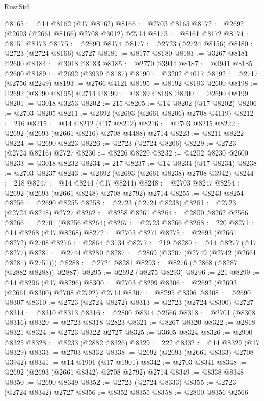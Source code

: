 \begin{lexlean}{RustStd}
\begin{coremodule}
@8165 := @14 @8162 (@17 @8162)
@8166 := @2703 @8165
@8172 := @2692 (@2693 (@2661 @8166) @2708 @3012) @2714
@8173 := @8161 @8172
@8174 := @8151 @8173
@8175 := @2690 @8174
@8177 := @2723 (@2724 @8156)
@8180 := @2723 (@2724 @8166) @2727
@8181 := @8177 @8180
@8183 := @3267 @8181 @2600
@8184 := @3018 @8183
@8185 := @2770 @3944
@8187 := @3941 @8185 @2600
@8189 := @2692 (@3939 @8187)
@8190 := @3202 @4017
@8192 := @2717 (@2756 @2249)
@8193 := @2766 @4121
@8195 := @8192 @8193 @2600
@8198 := @2692 (@8190 @8195) @2714
@8199 := @8189 @8198
@8200 := @2690 @8199
@8201 := @3018 @3253
@8202 := 215
@8205 := @14 @8202 (@17 @8202)
@8206 := @2703 @8205
@8211 := @2692 (@2693 (@2661 @8206) @2708 @4119)
@8212 := 216
@8215 := @14 @8212 (@17 @8212)
@8216 := @2703 @8215
@8222 := @2692 (@2693 (@2661 @8216) @2708 @4488) @2714
@8223 := @8211 @8222
@8224 := @2690 @8223
@8226 := @2723 (@2724 @8206)
@8229 := @2723 (@2724 @8216) @2727
@8230 := @8226 @8229
@8232 := @4202 @8230 @2600
@8233 := @3018 @8232
@8234 := 217
@8237 := @14 @8234 (@17 @8234)
@8238 := @2703 @8237
@8243 := @2692 (@2693 (@2661 @8238) @2708 @3942)
@8244 := 218
@8247 := @14 @8244 (@17 @8244)
@8248 := @2703 @8247
@8254 := @2692 (@2693 (@2661 @8248) @2708 @2792) @2714
@8255 := @8243 @8254
@8256 := @2690 @8255
@8258 := @2723 (@2724 @8238)
@8261 := @2723 (@2724 @8248) @2727
@8262 := @8258 @8261
@8264 := @2800 @8262 @2566
@8266 := @2701 (@8256 @8264)
@8267 := @2723 @8266
@8268 := 220
@8271 := @14 @8268 (@17 @8268)
@8272 := @2703 @8271
@8275 := @2693 (@2661 @8272) @2708
@8276 := @2864 @3134
@8277 := 219
@8280 := @14 @8277 (@17 @8277)
@8281 := @2744 @8280
@8287 := @2869 (@3207 (@2749 (@2742 (@2661 @8281) @2751)))
@8288 := @2724 @8281
@8293 := @8276 (@2868 (@8287 (@2882 @8288)) @2887)
@8295 := @2692 (@8275 @8293)
@8296 := 221
@8299 := @14 @8296 (@17 @8296)
@8300 := @2703 @8299
@8306 := @2692 (@2693 (@2661 @8300) @2708 @2792) @2714
@8307 := @8295 @8306
@8308 := @2690 @8307
@8310 := @2723 (@2724 @8272)
@8313 := @2723 (@2724 @8300) @2727
@8314 := @8310 @8313
@8316 := @2800 @8314 @2566
@8318 := @2701 (@8308 @8316)
@8320 := @2723 @8318 @2823
@8321 := @8267 @8320
@8322 := @2818 @8321
@8324 := @2723 @8322 @2727
@8325 := @3605 @8324
@8326 := @2900 @8325
@8328 := @8233 (@2882 @8326)
@8329 := 222
@8332 := @14 @8329 (@17 @8329)
@8333 := @2703 @8332
@8338 := @2692 (@2693 (@2661 @8333) @2708 @3942)
@8341 := @14 @1901 (@17 @1901)
@8342 := @2703 @8341
@8348 := @2692 (@2693 (@2661 @8342) @2708 @2792) @2714
@8349 := @8338 @8348
@8350 := @2690 @8349
@8352 := @2723 (@2724 @8333)
@8355 := @2723 (@2724 @8342) @2727
@8356 := @8352 @8355
@8358 := @2800 @8356 @2566

\end{coremodule}
\end{lexlean}
